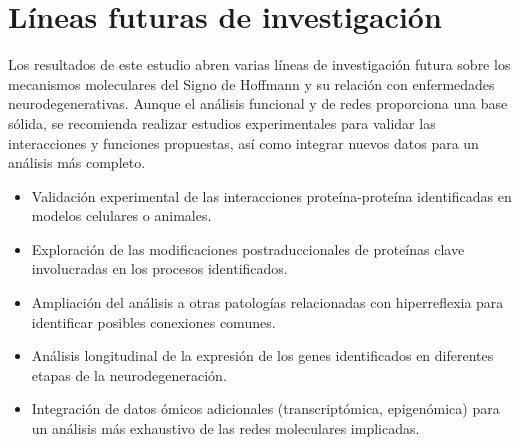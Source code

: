 \section{Líneas futuras de investigación}

Los resultados de este estudio abren varias líneas de investigación futura sobre los mecanismos moleculares del Signo de Hoffmann y su relación con enfermedades neurodegenerativas. Aunque el análisis funcional y de redes proporciona una base sólida, se recomienda realizar estudios experimentales para validar las interacciones y funciones propuestas, así como integrar nuevos datos para un análisis más completo.

\begin{itemize}
	\item Validación experimental de las interacciones proteína-proteína identificadas en modelos celulares o animales.
	\item Exploración de las modificaciones postraduccionales de proteínas clave involucradas en los procesos identificados.
	\item Ampliación del análisis a otras patologías relacionadas con hiperreflexia para identificar posibles conexiones comunes.
	\item Análisis longitudinal de la expresión de los genes identificados en diferentes etapas de la neurodegeneración.
	\item Integración de datos ómicos adicionales (transcriptómica, epigenómica) para un análisis más exhaustivo de las redes moleculares implicadas.
\end{itemize}

